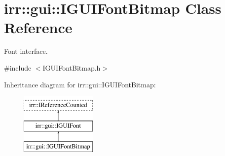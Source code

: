 \hypertarget{classirr_1_1gui_1_1IGUIFontBitmap}{}\section{irr\+:\+:gui\+:\+:I\+G\+U\+I\+Font\+Bitmap Class Reference}
\label{classirr_1_1gui_1_1IGUIFontBitmap}


Font interface.  




{\ttfamily \#include $<$I\+G\+U\+I\+Font\+Bitmap.\+h$>$}

Inheritance diagram for irr\+:\+:gui\+:\+:I\+G\+U\+I\+Font\+Bitmap\+:\begin{figure}[H]
\begin{center}
\leavevmode
\includegraphics[height=3.000000cm]{classirr_1_1gui_1_1IGUIFontBitmap}
\end{center}
\end{figure}
